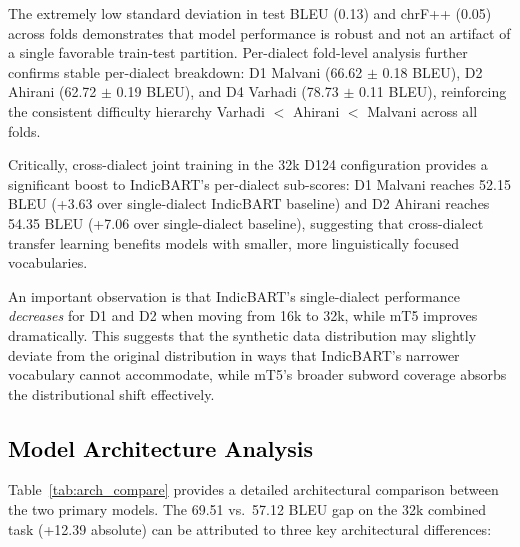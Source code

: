 The extremely low standard deviation in test BLEU (0.13) and chrF++ (0.05) across folds demonstrates that model performance is robust and not an artifact of a single favorable train-test partition. Per-dialect fold-level analysis further confirms stable per-dialect breakdown: D1 Malvani (66.62 $\pm$ 0.18 BLEU), D2 Ahirani (62.72 $\pm$ 0.19 BLEU), and D4 Varhadi (78.73 $\pm$ 0.11 BLEU), reinforcing the consistent difficulty hierarchy Varhadi $<$ Ahirani $<$ Malvani across all folds.

Critically, cross-dialect joint training in the 32k D124 configuration provides a significant boost to IndicBART's per-dialect sub-scores: D1 Malvani reaches 52.15 BLEU (+3.63 over single-dialect IndicBART baseline) and D2 Ahirani reaches 54.35 BLEU (+7.06 over single-dialect baseline), suggesting that cross-dialect transfer learning benefits models with smaller, more linguistically focused vocabularies.

An important observation is that IndicBART's single-dialect performance \textit{decreases} for D1 and D2 when moving from 16k to 32k, while mT5 improves dramatically. This suggests that the synthetic data distribution may slightly deviate from the original distribution in ways that IndicBART's narrower vocabulary cannot accommodate, while mT5's broader subword coverage absorbs the distributional shift effectively.

\subsection{\textcolor{black}{Model Architecture Analysis}}

Table~\ref{tab:arch_compare} provides a detailed architectural comparison between the two primary models. The 69.51 vs.\ 57.12 BLEU gap on the 32k combined task (+12.39 absolute) can be attributed to three key architectural differences:

